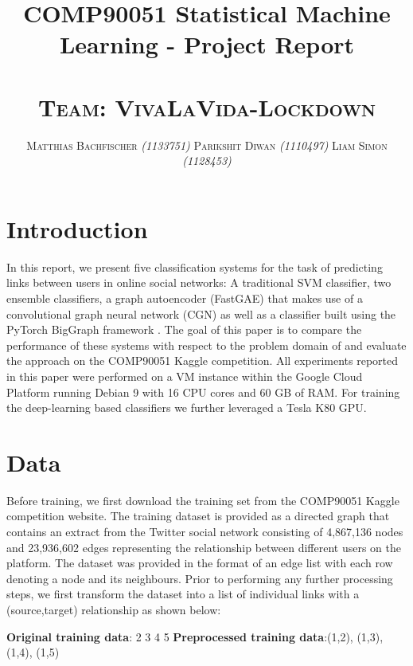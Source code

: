 \documentclass[11pt, oneside]{article}
\title{
		\normalfont COMP90051 Statistical Machine Learning - Project Report \\
		\\[0.2cm]
		\normalfont \normalsize \textsc{Team: VivaLaVida-Lockdown}
		\horrule{1pt}
}
\author{
		\normalfont \normalsize \textsc{Matthias Bachfischer \textit{(1133751)} \qquad Parikshit Diwan \textit{(1110497)}  \qquad
 Liam Simon \textit{(1128453)}
 }
}
\date{}
\begin{document}
\maketitle
\vspace{-30pt}
\section{Introduction}
\vspace{-10pt}
In this report, we present five classification systems for the task of predicting links between users in online social networks: A traditional SVM classifier, two ensemble classifiers, a graph autoencoder (FastGAE) that makes use of a convolutional graph neural network (CGN) as well as a classifier built using the PyTorch BigGraph framework \cite{pbg}. The goal of this paper is to compare the performance of these systems with respect to the problem domain of  and evaluate the approach on the COMP90051 Kaggle competition. 
\newline
All experiments reported in this paper were performed on a VM instance within the Google Cloud Platform running Debian 9 with 16 CPU cores and 60 GB of RAM. For training the deep-learning based classifiers we further leveraged a Tesla K80 GPU.
\vspace{-10pt}
\section{Data}
\vspace{-5pt}
Before training, we first download the training set from the COMP90051 Kaggle competition website. The training dataset is provided as a directed graph that contains an extract from the Twitter social network consisting of 4,867,136 nodes and 23,936,602 edges representing the relationship between different users on the platform.
\newline
The dataset was provided in the format of an edge list with each row denoting a node and its neighbours. Prior to performing any further processing steps, we first transform the dataset into a list of individual links with a (source,target) relationship as shown below:
\begin{mdframed}[backgroundcolor=gray230,userdefinedwidth=\textwidth]\footnotesize{}
   \textbf{Original training data}: \quad \quad {} 2 3 4 5
   \newline
   \textbf{Preprocessed training data}:\space \space (1,2), (1,3), (1,4), (1,5)
\end{mdframed}
\vspace{-20pt}
\end{document}
